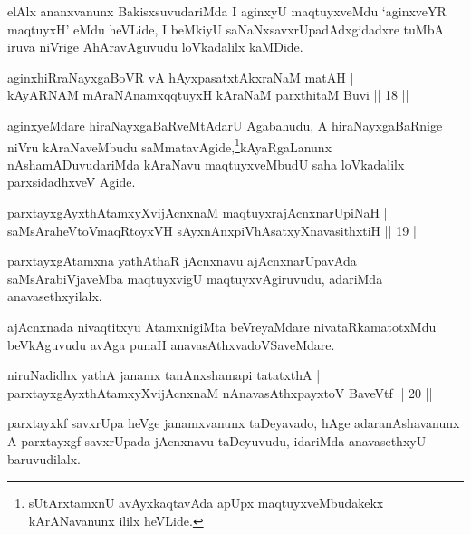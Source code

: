 \begin{artha}
elAlx ananxvanunx BakisxsuvudariMda I aginxyU maqtuyxveMdu `aginxveYR maqtuyxH'  eMdu heVLide, I 
beMkiyU saNaNxsavxrUpa\-dAdxgidadxre tuMbA iruva niVrige AhAravAguvudu loVkadalilx kaMDide.
\end{artha}


\begin{shl}
aginxhiRraNayxgaBoVR vA hAyxpasatxtAkxraNaM matAH |\\
kAyARNAM mAraNAnamxqqtuyxH kAraNaM parxthitaM Buvi \hfill || 18 ||
\end{shl}

\begin{artha}
aginxyeMdare hiraNayxgaBaRveMtAdarU Agabahudu, A hiraNayx\-gaBaRnige niVru kAraNaveMbudu 
saMmatavAgide,\footnote{sUtArxtamxnU avAyxkaqtavAda apUpx maqtuyxveMbudakekx kArANavanunx  
ililx heVLide.}kAyaRgaLanunx nAshamADuvudariMda kAraNavu maqtuyxveMbudU saha loVkadalilx parxsidadhxveV Agide.
\end{artha}


\begin{shl}
parxtayxgAyxthAtamxyXvijAcnxnaM maqtuyxrajAcnxnarUpiNaH |\\
saMsAraheVtoVmaqRtoyxVH sAyxnAnxpiVhAsatxyXnavasithxtiH \hfill || 19 ||
\end{shl}

\begin{artha}
parxtayxgAtamxna yathAthaR jAcnxnavu ajAcnxnarUpavAda saMsArabiVjaveMba maqtuyxvigU maqtuyxvAgiruvudu, adariMda anavasethxyilalx.
\end{artha}

\begin{artha}
ajAcnxnada nivaqtitxyu AtamxnigiMta beVreyaMdare nivataRka\break matotxMdu beVkAguvudu avAga 
punaH anavasAthxvadoVSaveMdare.
\end{artha}


\begin{shl}
niruNadidhx yathA janamx tanAnxshamapi tatatxthA |\\
parxtayxgAyxthAtamxyXvijAcnxnaM nAnavasAthx\s payxtoV BaveVtf \hfill || 20 ||
\end{shl}

\begin{artha}
parxtayxkf savxrUpa heVge janamxvanunx taDeyavado, hAge adaranAshavanunx A parxtayxgf 
savxrUpada jAcnxnavu taDeyuvudu, idariMda anavasethxyU baruvudilalx.
\end{artha}

